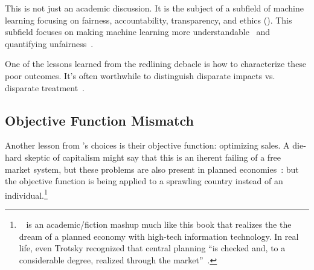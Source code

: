This is not just an academic discussion.  It is the subject of a
subfield of machine learning focusing on fairness, accountability,
transparency, and ethics ().
%
This subfield focuses on making machine learning more
understandable~\citep{DoshiVelez-17} and quantifying
unfairness~\citep{speicher-18}.

One of the lessons learned from the redlining debacle is how to
characterize these poor outcomes.  It's often worthwhile to
distinguish disparate impacts vs. disparate
treatment~\citep{hillier-03}.


\subsection{Objective Function Mismatch}

Another lesson from \energyCompany{}'s choices is their objective
function: optimizing sales.  A die-hard skeptic of capitalism might
say that this is an iherent failing of a free market system, but these
problems are also present in planned economies~\citep{moroney-97}:
but the objective function is being applied to a sprawling country
instead of an individual.\footnote{~\citep{spufford-10} is an academic/fiction mashup much like
  this book that realizes the the dream of a planned economy with
  high-tech information technology.  In real life, even Trotsky
  recognized that central planning ``is checked and, to a considerable
  degree, realized through the market''~\citep{trotsky-32}.}

